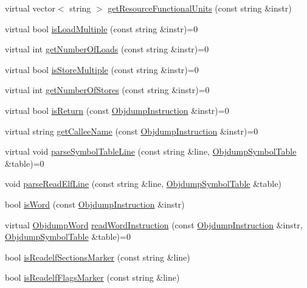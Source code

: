\begin{DoxyCompactItemize}
\item 
virtual vector$<$ string $>$ \hyperlink{classArch__dep_a6aa967ba3a9e3cf2954cc376c6ce6a06}{get\+Resource\+Functional\+Units} (const string \&instr)
\item 
virtual bool \hyperlink{classArch__dep_a1d8126e04db14a502e3b26be2f032552}{is\+Load\+Multiple} (const string \&instr)=0
\item 
virtual int \hyperlink{classArch__dep_a914556a124481b77698440f0cf6a5f24}{get\+Number\+Of\+Loads} (const string \&instr)=0
\item 
virtual bool \hyperlink{classArch__dep_a54438a476a16d55659124aea0c38397a}{is\+Store\+Multiple} (const string \&instr)=0
\item 
virtual int \hyperlink{classArch__dep_afd76af2d5947f461e8a04be6b45c2596}{get\+Number\+Of\+Stores} (const string \&instr)=0
\item 
virtual bool \hyperlink{classArch__dep_a0f8a68b8dc2188a0578f3b4d92a289ca}{is\+Return} (const \hyperlink{classObjdumpInstruction}{Objdump\+Instruction} \&instr)=0
\item 
virtual string \hyperlink{classArch__dep_ad09e79609dda858cdbd651064623ae2b}{get\+Callee\+Name} (const \hyperlink{classObjdumpInstruction}{Objdump\+Instruction} \&instr)=0
\item 
virtual void \hyperlink{classArch__dep_a5d50b1a54bf2afc034b813d1008c9f8e}{parse\+Symbol\+Table\+Line} (const string \&line, \hyperlink{classObjdumpSymbolTable}{Objdump\+Symbol\+Table} \&table)=0
\item 
void \hyperlink{classArch__dep_abf6d4090f19269e8718b2597984f52e7}{parse\+Read\+Elf\+Line} (const string \&line, \hyperlink{classObjdumpSymbolTable}{Objdump\+Symbol\+Table} \&table)
\item 
bool \hyperlink{classArch__dep_a690346c11242f24dc8d692f864e20ccc}{is\+Word} (const \hyperlink{classObjdumpInstruction}{Objdump\+Instruction} \&instr)
\item 
virtual \hyperlink{classObjdumpWord}{Objdump\+Word} \hyperlink{classArch__dep_a9e6075dd5bc43a1522aa65f2d11dad06}{read\+Word\+Instruction} (const \hyperlink{classObjdumpInstruction}{Objdump\+Instruction} \&instr, \hyperlink{classObjdumpSymbolTable}{Objdump\+Symbol\+Table} \&table)=0
\item 
bool \hyperlink{classArch__dep_af20f87a328dec6fd2c1fe8d8106c00cb}{is\+Readelf\+Sections\+Marker} (const string \&line)
\item 
bool \hyperlink{classArch__dep_ac38abb4817048b6cb4c996042f478318}{is\+Readelf\+Flags\+Marker} (const string \&line)

\end{DoxyCompactItemize}
